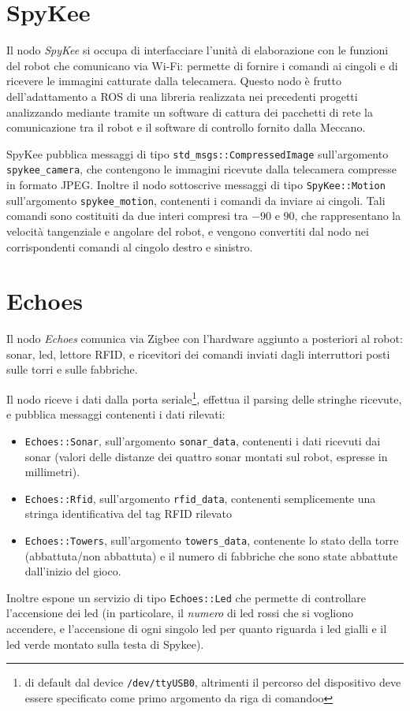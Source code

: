 \section{SpyKee}
Il nodo \emph{SpyKee} si occupa di interfacciare l'unità di elaborazione con le funzioni del robot che comunicano via Wi-Fi: permette di fornire i comandi ai cingoli e di ricevere le immagini catturate dalla telecamera. Questo nodo è frutto dell'adattamento a ROS di una libreria realizzata nei precedenti progetti analizzando mediante tramite un software di cattura dei pacchetti di rete la comunicazione tra il robot e il software di controllo fornito dalla Meccano.

SpyKee pubblica messaggi di tipo \verb|std_msgs::CompressedImage| sull'argomento \verb|spykee_camera|, che contengono le immagini ricevute dalla telecamera compresse in formato JPEG. Inoltre il nodo sottoscrive messaggi di tipo \verb|SpyKee::Motion| sull'argomento \verb|spykee_motion|, contenenti i comandi da inviare ai cingoli. Tali comandi sono costituiti da due interi compresi tra $-90$ e $90$, che rappresentano la velocità tangenziale e angolare del robot, e vengono convertiti dal nodo nei corrispondenti comandi al cingolo destro e sinistro.

\section{Echoes}
Il nodo \emph{Echoes} comunica via Zigbee con l'hardware aggiunto a posteriori al robot: sonar, led, lettore RFID, e ricevitori dei comandi inviati dagli interruttori posti sulle torri e sulle fabbriche.

Il nodo riceve i dati dalla porta seriale\footnote{di default dal device \texttt{/dev/ttyUSB0}, altrimenti il percorso del dispositivo deve essere specificato come primo argomento da riga di comandoo}, effettua il parsing delle stringhe ricevute, e pubblica messaggi contenenti i dati rilevati:
\begin{itemize}
	\item \verb|Echoes::Sonar|, sull'argomento \verb|sonar_data|, contenenti i dati ricevuti dai sonar (valori delle distanze dei quattro sonar montati sul robot, espresse in millimetri).
	\item \verb|Echoes::Rfid|, sull'argomento \verb|rfid_data|, contenenti semplicemente una stringa identificativa del tag RFID rilevato
	\item \verb|Echoes::Towers|, sull'argomento \verb|towers_data|, contenente lo stato della torre (abbattuta/non abbattuta) e il numero di fabbriche che sono state abbattute dall'inizio del gioco. %
\end{itemize}
Inoltre espone un servizio di tipo \verb|Echoes::Led| che permette di controllare l'accensione dei led (in particolare, il \emph{numero} di led rossi che si vogliono accendere, e l'accensione di ogni singolo led per quanto riguarda i led gialli e il led verde montato sulla testa di Spykee). %

